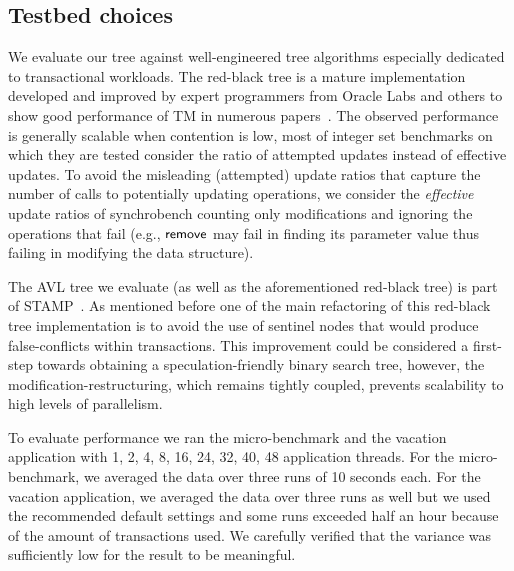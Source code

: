 \subsection{Testbed choices}
We evaluate our tree against well-engineered 
tree algorithms especially dedicated to transactional workloads.
%
The red-black tree is a mature implementation developed and improved by expert programmers from Oracle Labs and 
others to show good performance of TM in numerous papers~\cite{DSS06,HLMS03,CCKO08,HK08,FFR08,YNW+08,DFGG11}.
The observed performance is generally scalable when contention is low, most of integer set benchmarks on which they are tested 
consider the ratio of attempted updates instead of effective updates. 
To avoid the misleading (attempted) update ratios that capture the number of calls to potentially updating operations, we consider the \emph{effective} update ratios of synchrobench 
counting only modifications and ignoring the operations that fail (e.g., $\act{remove}$ may fail in finding its parameter value thus failing in modifying the data structure).

The AVL tree we evaluate (as well as the aforementioned red-black tree) is part of STAMP~\cite{CCKO08}. 
As mentioned before one of the main refactoring of this red-black tree implementation is to avoid the use of sentinel nodes that would 
produce false-conflicts within transactions. This improvement could be considered a first-step towards obtaining a speculation-friendly binary 
search tree, however, the modification-restructuring, which remains tightly coupled, prevents scalability to high levels of parallelism.

To evaluate performance we ran the micro-benchmark and the vacation application with 1, 2, 4, 8, 16, 24, 32, 40, 48 application threads.
For the micro-benchmark, we averaged the data over three runs of 10 seconds each. For the vacation application, we averaged the data over 
three runs as well but we used 
the recommended default settings and some runs exceeded half an hour because of the amount of transactions used. 
We carefully verified that the variance was sufficiently low for the result to be meaningful.

